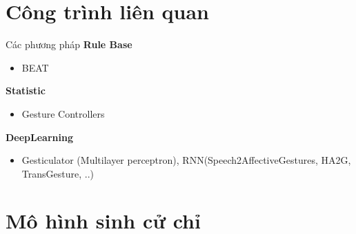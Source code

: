 \documentclass[10pt,mathserif]{beamer}
\begin{document}
%


\section{Công trình liên quan}

\begin{frame}{Các phương pháp}
	\textbf{Rule Base}
	\begin{itemize}
		\item BEAT
	\end{itemize}
	
	\textbf{Statistic}
	\begin{itemize}
		\item Gesture Controllers
	\end{itemize}
	
	\textbf{DeepLearning}
	\begin{itemize}
		\item Gesticulator (Multilayer perceptron), RNN(Speech2AffectiveGestures, HA2G, TransGesture, ..)
	\end{itemize}
	
\end{frame}

\section{Mô hình sinh cử chỉ}
\end{document}
